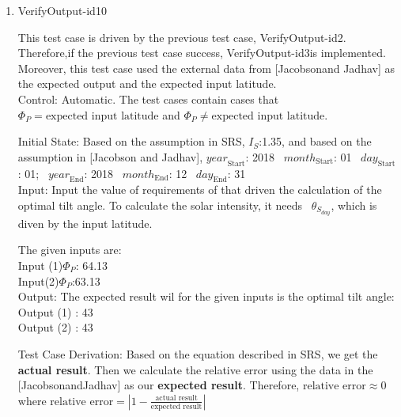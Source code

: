 \documentclass[12pt, titlepage]{article}
\begin{document}
\begin{enumerate}
\item{VerifyOutput-id10\\} 

This test case is driven by the previous test case, VerifyOutput-id2.
Therefore,if the previous test case success, VerifyOutput-id3is implemented.\\
Moreover, this test case used the external data from [Jacobsonand
Jadhav\cite{JacobsonandJadhav}] as the expected output and the expected
input latitude.\\ 

Control: Automatic. The test cases contain cases that $\Phi_P
= \text{expected input latitude}$ and $\Phi_P \ne \text{expected input
latitude}$. 

Initial State: Based on the assumption in SRS\cite{YS2019}, $I_{S}$:1.35, and
based on the assumption in [Jacobson and Jadhav\cite{JacobsonandJadhav}],
$\mathit{year}_\text{Start}$: 2018
~$\mathit{month}_\text{Start}$: 01 
~$\mathit{day}_\text{Start}$: 01;
~$\mathit{year}_\text{End}$: 2018 
~$\mathit{month}_\text{End}$: 12
~$\mathit{day}_\text{End}$: 31\\ 

Input: Input the value of requirements of
\progname that driven the calculation of the optimal tilt angle. To calculate
the solar intensity, it needs ~$\theta_{S_{day}}$, which is diven by the input
latitude. 

The given inputs are:\\
 Input (1)$\Phi_P$: 64.13 \\ 
Input(2)$\Phi_P$:63.13\\

Output: The expected result wil for the given inputs is the optimal tilt
angle:\\ Output (1) : 43\\ Output (2) : 43\\


Test Case Derivation: Based on the equation described in SRS\cite{YS2019}, we
get the \textbf{actual result}. Then we calculate the relative error using the
data in the
 [JacobsonandJadhav\cite{JacobsonandJadhav}] as our \textbf{expected result}. 
Therefore, $\text{relative error} \approx 0$ where $\text{relative error} =
 | 1 - \frac{\text{actual result}}{ \text{expected result}} |$ 



\end{enumerate}
\end{document}

